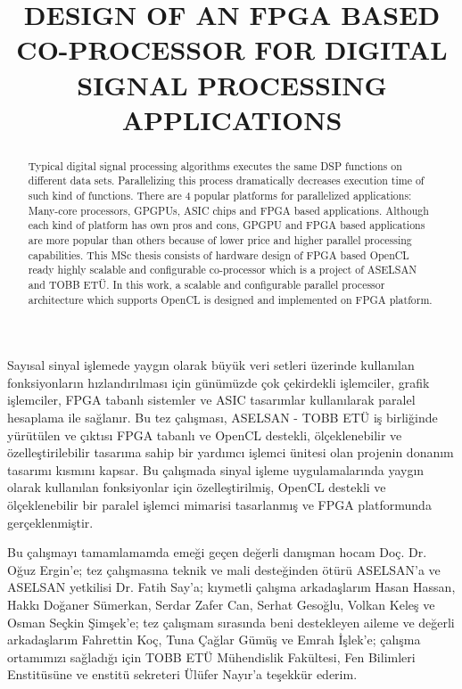 \documentclass{etutez}
\title{DESIGN OF AN FPGA BASED CO-PROCESSOR FOR DIGITAL SIGNAL PROCESSING APPLICATIONS}
\institute{Institute of Natural and Applied Sciences}
\begin{document}
\titlepageMS   %
\signaturepageMS  %
\tezbildirimsayfasi    %


\begin{ozet}
	Sayısal sinyal işlemede yaygın olarak büyük veri setleri üzerinde kullanılan fonksiyonların hızlandırılması için günümüzde çok çekirdekli işlemciler, grafik işlemciler, FPGA tabanlı sistemler ve ASIC tasarımlar kullanılarak paralel hesaplama ile sağlanır. Bu tez çalışması, ASELSAN - TOBB ETÜ iş birliğinde yürütülen ve çıktısı FPGA tabanlı ve OpenCL destekli, ölçeklenebilir ve özelleştirilebilir tasarıma sahip bir yardımcı işlemci ünitesi olan projenin donanım tasarımı kısmını kapsar. Bu çalışmada sinyal işleme uygulamalarında yaygın olarak kullanılan fonksiyonlar için özelleştirilmiş, OpenCL destekli ve ölçeklenebilir bir paralel işlemci mimarisi tasarlanmış ve FPGA platformunda gerçeklenmiştir.
\end{ozet}



\begin{abstract}
	Typical digital signal processing algorithms executes the same DSP functions on different data sets. Parallelizing this process dramatically decreases execution time of such kind of functions. There are 4 popular platforms for parallelized applications: Many-core processors, GPGPUs, ASIC chips and FPGA based applications. Although each kind of platform has own pros and cons, GPGPU and FPGA based applications are more popular than others because of lower price and higher parallel processing capabilities. This MSc thesis consists of hardware design of FPGA based OpenCL ready highly scalable and configurable co-processor which is a project of ASELSAN and TOBB ETÜ. In this work, a scalable and configurable parallel processor architecture which supports OpenCL is designed and implemented on FPGA platform.  
\end{abstract}


\begin{tesekkur}
 Bu çalışmayı tamamlamamda emeği geçen değerli danışman hocam Doç. Dr. Oğuz Ergin'e; tez çalışmasına teknik ve mali desteğinden ötürü ASELSAN'a ve ASELSAN yetkilisi Dr. Fatih Say'a; kıymetli çalışma arkadaşlarım Hasan Hassan, Hakkı Doğaner Sümerkan, Serdar Zafer Can, Serhat Gesoğlu, Volkan Keleş ve Osman Seçkin Şimşek'e; tez çalışmam sırasında beni destekleyen aileme ve değerli arkadaşlarım Fahrettin Koç, Tuna Çağlar Gümüş ve Emrah İşlek'e; çalışma ortamımızı sağladığı için TOBB ETÜ Mühendislik Fakültesi, Fen Bilimleri Enstitüsüne ve enstitü sekreteri Ülüfer Nayır'a teşekkür ederim.
\end{tesekkur}



\pagestyle{plain}




\makeatother
\end{document}
